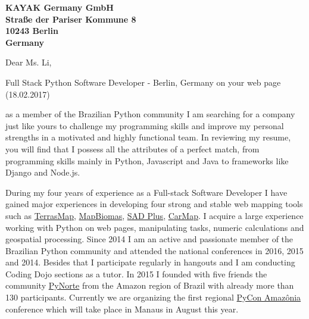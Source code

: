 \documentclass[a4paper]{joaosoares-letter}
\begin{document}
\longindentation=0pt

\begin{letter}{\bfseries KAYAK Germany GmbH\\Straße der Pariser Kommune 8\\10243 Berlin \\Germany}


\date{Belém, \today}

\opening{Dear Ms. Li,}{Full Stack Python Software Developer - Berlin, Germany on your web page (18.02.2017)
}


as a member of the Brazilian Python community I am searching for a company just like yours to challenge my programming skills and improve my personal strengths in a motivated and highly functional team. In reviewing my resume, you will find that I possess all the attributes of a perfect match, from programming skills mainly in Python, Javascript and Java to frameworks like Django and Node.js.

During my four years of experience as a Full-stack Software Developer I have gained major experiences in developing four strong and stable web mapping tools such as \href{https://goo.gl/6gUzPA}{TerrasMap}, \href{https://goo.gl/eYX5SW}{MapBiomas}, \href{https://goo.gl/2J41hR}{SAD Plus}, \href{https://goo.gl/fCCp9s}{CarMap}. I acquire a large experience working with Python on web pages, manipulating tasks, numeric calculations and geospatial processing. Since 2014 I am an active and passionate member of the Brazilian Python community and attended the national conferences in 2016, 2015 and 2014. Besides that I participate regularly in hangouts and I am conducting Coding Dojo sections as a tutor. In 2015 I founded with five friends the community \href{http://pynorte.python.org.br}{PyNorte} from the Amazon region of Brazil with already more than 130 participants. Currently we are organizing the first regional \href{http://amazonia.python.org.br/}{PyCon Amazônia} conference which will take place in Manaus in August this year.


\end{letter}
\end{document}
